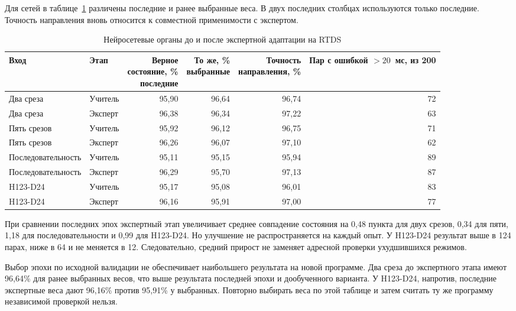 Для сетей в таблице~\ref{tab:ch5_rtds_neural}
различены последние и ранее выбранные веса.
В двух последних столбцах используются только последние.
Точность направления вновь относится
к совместной применимости с экспертом.

\begin{table}[htbp]
\centering\small
\caption{Нейросетевые органы до и после экспертной адаптации на RTDS}
\label{tab:ch5_rtds_neural}
\setlength{\tabcolsep}{3pt}
\begin{tabular}{p{}p{}rrrr}
\toprule
Вход & Этап & \shortstack{Верное\\состояние, \%\\последние}
 & \shortstack{То же, \%\\выбранные}
 & \shortstack{Точность\\направления, \%}
 & \shortstack{Пар с ошибкой\\$>20$~мс, из 200} \\
\midrule
Два среза & Учитель & 95,90 & 96,64 & 96,74 & 72 \\
Два среза & Эксперт & 96,38 & 96,34 & 97,22 & 63 \\
Пять срезов & Учитель & 95,92 & 96,12 & 96,75 & 71 \\
Пять срезов & Эксперт & 96,26 & 96,07 & 97,10 & 62 \\
Последова\-тельность & Учитель & 95,11 & 95,15 & 95,94 & 89 \\
Последова\-тельность & Эксперт & 96,29 & 95,70 & 97,13 & 87 \\
H123-D24 & Учитель & 95,17 & 95,08 & 96,01 & 83 \\
H123-D24 & Эксперт & 96,16 & 95,91 & 97,00 & 77 \\
\bottomrule
\end{tabular}
\end{table}

При сравнении последних эпох экспертный этап
увеличивает среднее совпадение состояния на 0,48 пункта
для двух срезов, 0,34 для пяти,
1,18 для последовательности и 0,99 для H123-D24.
Но улучшение не распространяется на каждый опыт.
У H123-D24 результат выше в 124 парах,
ниже в 64 и не меняется в 12.
Следовательно, средний прирост не заменяет
адресной проверки ухудшившихся режимов.

Выбор эпохи по исходной валидации
не обеспечивает наибольшего результата на новой программе.
Два среза до экспертного этапа имеют 96,64\%
для ранее выбранных весов, что выше результата
последней эпохи и дообученного варианта.
У H123-D24, напротив, последние экспертные веса
дают 96,16\% против 95,91\% у выбранных.
Повторно выбирать веса по этой таблице
и затем считать ту же программу независимой проверкой нельзя.

